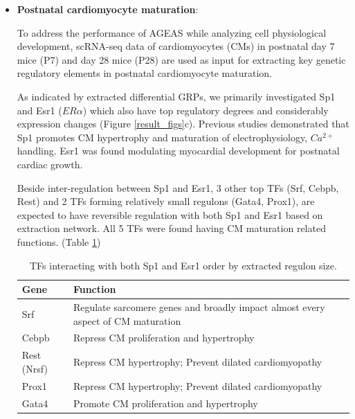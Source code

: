 \documentclass[fleqn,10pt]{wlscirep}
\begin{document}
\begin{itemize}


      \item {\textbf{Postnatal cardiomyocyte maturation}}:

        To address the performance of AGEAS while analyzing cell physiological development, scRNA-seq data of cardiomyocytes (CMs) in postnatal day 7 mice (P7) and day 28 mice (P28) are used as input for extracting key genetic regulatory elements in postnatal cardiomyocyte maturation.

        As indicated by extracted differential GRPs, we primarily investigated Sp1 and Esr1 ($ER\alpha$) which also have top regulatory degrees and considerably expression changes (Figure \ref{result_figs}c).
        Previous studies demonstrated that Sp1 promotes CM hypertrophy \cite{sp1_hypertrophy} and maturation of electrophysiology, $Ca^{2+}$ handling. \cite{Sp1_electrophysiologt, CM_mature}
        Esr1 was found modulating myocardial development for postnatal cardiac growth.\cite{esr1_cm, esr1_cm_growth}

        Beside inter-regulation between Sp1 and Esr1, 3 other top TFs (Srf, Cebpb, Rest) and 2 TFs forming relatively small regulons (Gata4, Prox1), are expected to have reversible regulation with both Sp1 and Esr1 based on extraction network.
        All 5 TFs were found having CM maturation related functions. (Table \ref{interact_TFs})

        \begin{table}[ht]
            \centering
            \begin{tabular}{|l|l|}
              \hline
              \textbf{Gene} & \textbf{Function}  \\
              \hline
              Srf & Regulate sarcomere genes and broadly impact almost every aspect of CM maturation\cite{CM_mature} \\
              \hline
              Cebpb & Repress CM proliferation and hypertrophy\cite{cebpb_1, cebpb_2}\\
              \hline
              Rest (Nrsf) & Repress CM hypertrophy; Prevent dilated cardiomyopathy\cite{rest_1}\\
              \hline
              Prox1 & Repress CM hypertrophy; Prevent dilated cardiomyopathy\cite{prox1_CM} \\
              \hline
              Gata4 & Promote CM proliferation and hypertrophy\cite{CM_posnatal_mature} \\
              \hline
            \end{tabular}
            \caption{
              \label{interact_TFs}
              TFs interacting with both Sp1 and Esr1 order by extracted regulon size.
            }
        \end{table}


\end{itemize}
\end{document}
